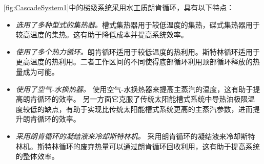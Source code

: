 \autoref{fig:CascadeSystem1}中的梯级系统采用水工质朗肯循环，具有以下特点：
\begin{itemize}
  \item \emph{选用了多种型式的集热器。}槽式集热器用于较低温度的集热，碟式集热器用于较高温度的集热。这有助于降低成本并提高系统效率。
  \item \emph{使用了多个热力循环。}朗肯循环适用于较低温度的热利用。斯特林循环适用于更高温度的热利用。二者工作区间的不同使得底部循环利用顶部循环释放的热量成为可能。
  \item \emph{使用了空气-水换热器。} 使用空气-水换热器来提高主蒸汽的温度，这有助于提高朗肯循环的效率。 另一方面它克服了传统太阳能槽式系统中导热油极限温度较低的缺点，有助于实现比传统太阳能槽式系统更高的主蒸汽参数，进而提升朗肯循环的效率。 
  \item \emph{采用朗肯循环的凝结液来冷却斯特林机。} 采用朗肯循环的凝结液来冷却斯特林机。斯特林循环的废弃热量可以通过朗肯循环回收利用，这有助于提高系统的整体效率。
\end{itemize}

